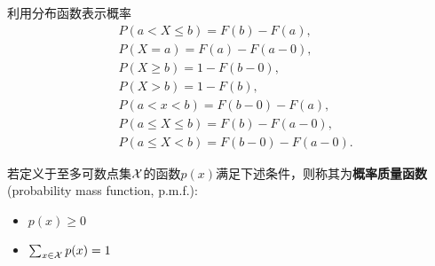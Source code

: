 
利用分布函数表示概率
\begin{align*}
     & P(a<X \leq b) = F(b)-F(a),        \\
     & P(X=a) = F(a)-F(a-0),             \\
     & P(X \geq b) = 1-F(b-0),           \\
     & P(X>b) = 1-F(b),                  \\
     & P(a<x<b) = F(b-0)-F(a),           \\
     & P(a \leq X \leq b) = F(b)-F(a-0), \\
     & P(a \leq X<b) = F(b-0)-F(a-0).
\end{align*}

\begin{definition}[概率质量函数]
    若定义于至多可数点集$\mathcal{X}$的函数$p(x)$满足下述条件，则称其为\textbf{概率质量函数}(probability mass function, p.m.f.):
    \begin{itemize}
        \item $p(x)\ge 0$
        \item $\sum_{x \in \mathcal{X}}p(x)=1$
    \end{itemize}
\end{definition}

